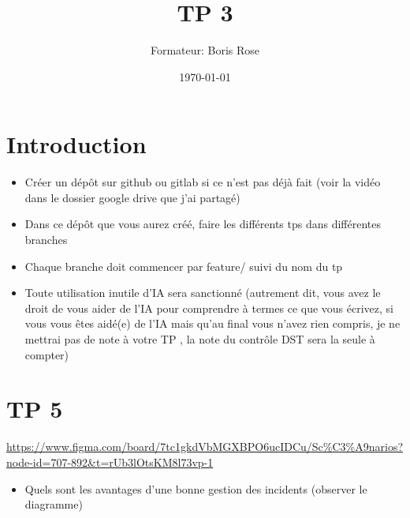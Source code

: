 \documentclass[12pt, letterpaper]{article}
\title{TP 3}
\author{Formateur: Boris Rose}
\date{\today}
\begin{document}
\maketitle

\section*{Introduction}

\begin{tcolorbox}[colback=brown!5,colframe=brown!60!black,title=Consignes]

\begin{itemize}
    \item Créer un dépôt sur github ou gitlab si ce n'est pas déjà fait (voir la vidéo dans le dossier google drive que j'ai partagé)
    \item Dans ce dépôt que vous aurez créé, faire les différents tps dans différentes branches
    \item Chaque branche doit commencer par feature/ suivi du nom du tp 
    \item Toute utilisation inutile d'IA sera sanctionné (autrement dit, vous avez le droit de vous aider de l'IA pour comprendre à termes ce que vous écrivez, si vous vous êtes aidé(e) de l'IA mais qu'au final vous n'avez rien compris, je ne mettrai pas de note à votre TP , la note du contrôle DST sera la seule à compter)
\end{itemize}


\end{tcolorbox}


\section*{TP 5}


\begin{tcolorbox}[colback=cyan!5,colframe=cyan!60!black,title=Figma du Cours]
    \url{https://www.figma.com/board/7tc1gkdVbMGXBPO6ucIDCu/Sc%C3%A9narios?node-id=707-892&t=rUb3lOtsKM8l73vp-1}
\end{tcolorbox}

\begin{itemize}
    \item Quels sont les avantages d'une bonne gestion des incidents (observer le diagramme)

\end{itemize}
\end{document}
